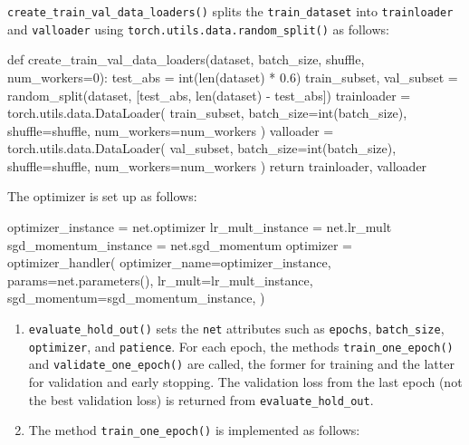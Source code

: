\documentclass[
  letterpaper,
  DIV=11,
  numbers=noendperiod]{scrreprt}
\newenvironment{Shaded}{\begin{snugshade}}{\end{snugshade}}
\newcommand{\NormalTok}[1]{\textcolor[rgb]{0.00,0.23,0.31}{#1}}
\providecommand{\tightlist}{%
  \setlength{\itemsep}{0pt}\setlength{\parskip}{0pt}}\usepackage{longtable,booktabs,array}
\begin{document}
\texttt{create\_train\_val\_data\_loaders()} splits the
\texttt{train\_dataset} into \texttt{trainloader} and \texttt{valloader}
using \texttt{torch.utils.data.random\_split()} as follows:

\begin{Shaded}
\begin{Highlighting}[]
\NormalTok{def create\_train\_val\_data\_loaders(dataset, batch\_size, shuffle, num\_workers=0):}
\NormalTok{    test\_abs = int(len(dataset) * 0.6)}
\NormalTok{    train\_subset, val\_subset = random\_split(dataset, [test\_abs, len(dataset) {-} test\_abs])}
\NormalTok{    trainloader = torch.utils.data.DataLoader(}
\NormalTok{        train\_subset, batch\_size=int(batch\_size), shuffle=shuffle, num\_workers=num\_workers}
\NormalTok{    )}
\NormalTok{    valloader = torch.utils.data.DataLoader(}
\NormalTok{        val\_subset, batch\_size=int(batch\_size), shuffle=shuffle, num\_workers=num\_workers}
\NormalTok{    )}
\NormalTok{    return trainloader, valloader}
\end{Highlighting}
\end{Shaded}

The optimizer is set up as follows:

\begin{Shaded}
\begin{Highlighting}[]
\NormalTok{optimizer\_instance = net.optimizer}
\NormalTok{lr\_mult\_instance = net.lr\_mult}
\NormalTok{sgd\_momentum\_instance = net.sgd\_momentum}
\NormalTok{optimizer = optimizer\_handler(}
\NormalTok{    optimizer\_name=optimizer\_instance,}
\NormalTok{    params=net.parameters(),}
\NormalTok{    lr\_mult=lr\_mult\_instance,}
\NormalTok{    sgd\_momentum=sgd\_momentum\_instance,}
\NormalTok{)}
\end{Highlighting}
\end{Shaded}

\begin{enumerate}
\def\labelenumi{\arabic{enumi}.}
\setcounter{enumi}{2}
\tightlist
\item
  \texttt{evaluate\_hold\_out()} sets the \texttt{net} attributes such
  as \texttt{epochs}, \texttt{batch\_size}, \texttt{optimizer}, and
  \texttt{patience}. For each epoch, the methods
  \texttt{train\_one\_epoch()} and \texttt{validate\_one\_epoch()} are
  called, the former for training and the latter for validation and
  early stopping. The validation loss from the last epoch (not the best
  validation loss) is returned from \texttt{evaluate\_hold\_out}.
\item
  The method \texttt{train\_one\_epoch()} is implemented as follows:
\end{enumerate}
\end{document}
